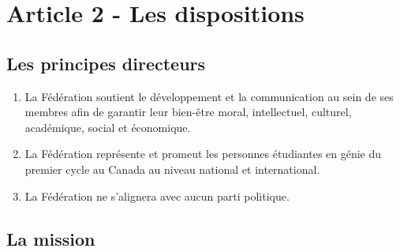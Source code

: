 \section{Article 2 - Les dispositions}
\label{article-2-les-dispositions}

\subsection{Les principes directeurs}
\label{les-principes-directeurs}

\begin{enumerate}
 \item
  La Fédération soutient le développement et la communication au sein de ses membres afin de garantir leur bien-être moral, intellectuel, culturel, académique, social et économique.
 \item
  La Fédération représente et promeut les personnes étudiantes en génie du premier cycle au Canada au niveau national et international.
 \item
  La Fédération ne s'alignera avec aucun parti politique.
\end{enumerate}

\subsection{La mission}
\label{la-mission}

